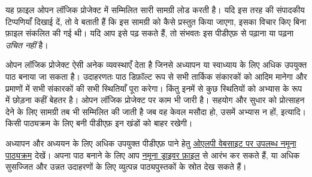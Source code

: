 \documentclass[../include/open-logic-part]{subfiles}
\begin{document}
\clearpage

\begin{editorial}
यह फ़ाइल ओपन लॉजिक प्रोजेक्ट में सम्मिलित सारी सामग्री लोड करती है। यदि इस
तरह की संपादकीय टिप्पणियाँ दिखाई दें, तो वे बताती हैं कि इस सामग्री को कैसे
प्रस्तुत किया जाएगा, इसका विचार किए बिना फ़ाइल संकलित की गई थी। यदि आप इसे
पढ़ सकते हैं, तो संभवतः इस पीडीएफ़ से पढ़ाना या पढ़ना \emph{उचित नहीं} है।

ओपन लॉजिक प्रोजेक्ट ऐसी अनेक व्यवस्थाएँ देता है जिनसे अध्यापन या स्वाध्याय
के लिए अधिक उपयुक्त पाठ बनाया जा सकता है। उदाहरणतः पाठ डिफ़ॉल्ट रूप से सभी
तार्किक संकारकों को आदिम मानेगा और प्रमाणों में सभी संकारकों की सभी स्थितियाँ
पूरा करेगा। किंतु इनमें से कुछ स्थितियों को अभ्यास के रूप में छोड़ना कहीं
बेहतर है। ओपन लॉजिक प्रोजेक्ट पर काम भी जारी है। सहयोग और सुधार को प्रोत्साहन
देने के लिए सामग्री तब भी सम्मिलित की जाती है जब वह केवल मसौदा हो, उसमें
अभ्यास न हों, इत्यादि। किसी पाठ्यक्रम के लिए बनी पीडीएफ़ इन खंडों को बाहर
रखेगी।

अध्यापन और अध्ययन के लिए अधिक उपयुक्त पीडीएफ़ पाने हेतु
\href{http://builds.openlogicproject.org/}{ओएलपी वेबसाइट पर उपलब्ध नमूना
पाठ्यक्रम} देखें। अपना पाठ बनाने के लिए आप
\href{https://github.com/OpenLogicProject/OpenLogic/tree/master/courses/sample}{नमूना
ड्राइवर फ़ाइल} से आरंभ कर सकते हैं, या अधिक सुसज्जित और उन्नत उदाहरणों के
लिए व्युत्पन्न पाठ्यपुस्तकों के स्रोत देख सकते हैं।
\end{editorial}


















\end{document}
